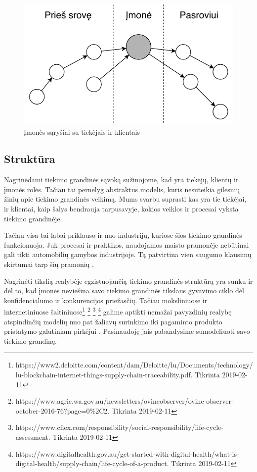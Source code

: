 \begin{figure}[H]
    \centering
    \includegraphics[scale=1]{images/supply-chain-upstream-downstream}
    \caption{Įmonės sąryšiai su tiekėjais ir klientais}
\end{figure}




\subsection{Struktūra}

Nagrinėdami tiekimo grandinės sąvoką sužinojome, kad yra tiekėjų, klientų ir įmonės rolės. Tačiau tai pernelyg abstraktus modelis, kuris nesuteikia gilesnių žinių apie tiekimo grandinės veikimą. Mums svarbu suprasti kas yra tie tiekėjai, ir klientai, kaip šalys bendrauja tarpusavyje, kokios veiklos ir procesai vyksta tiekimo grandinėje. 

Tačiau visa tai labai priklauso ir nuo industrijų, kuriose šios tiekimo grandinės funkcionuoja. Juk procesai ir praktikos, naudojamos maisto pramonėje nebūtinai gali tikti automobilių gamybos industrijoje. Tą patvirtina vien saugumo klausimų skirtumai tarp šių pramonių \cite{marucheck2011product}.

Nagrinėti tikslią realybėje egzistuojančią tiekimo grandinės struktūrą yra sunku ir dėl to, kad įmonės neviešina savo tiekimo grandinės tikslaus gyvavimo ciklo dėl konfidencialumo ir konkurencijos priežasčių. Tačiau moksliniuose ir internetiniuose šaltiniuose\footnote{https://www2.deloitte.com/content/dam/Deloitte/lu/Documents/technology/lu-blockchain-internet-things-supply-chain-traceability.pdf. Tikrinta 2019-02-11} \footnote{https://www.agric.wa.gov.au/newsletters/ovineobserver/ovine-observer-october-2016-76?page=0\%2C2. Tikrinta 2019-02-11} \footnote{https://www.cflex.com/responsibility/social-responsibility/life-cycle-assessment. Tikrinta 2019-02-11} \footnote{https://www.digitalhealth.gov.au/get-started-with-digital-health/what-is-digital-health/supply-chain/life-cycle-of-a-product. Tikrinta 2019-02-11} galime aptikti nemažai pavyzdinių realybę atspindinčių modelių nuo pat žaliavų surinkimo iki pagaminto produkto pristatymo galutiniam pirkėjui \cite{christopher2016logistics} \cite{webber2009building}. Pasinaudoję jais pabandysime sumodeliuoti savo tiekimo grandinę.

